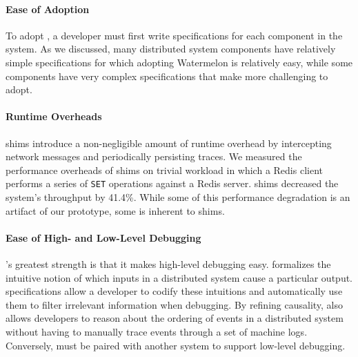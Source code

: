 \paragraph{Ease of Adoption}
To adopt \fluent{}, a developer must first write \watprovenance{}
specifications for each component in the system. As we discussed, many
distributed system components have relatively simple \watprovenance{}
specifications for which adopting Watermelon is relatively easy, while some
components have very complex \watprovenance{} specifications that make
\fluent{} more challenging to adopt.

\paragraph{Runtime Overheads}
\fluent{} shims introduce a non-negligible amount of runtime overhead by
intercepting network messages and periodically persisting traces. We measured
the performance overheads of \fluent{} shims on trivial workload in which a
Redis client performs a series of \texttt{SET} operations against a Redis
server. \fluent{} shims decreased the system's throughput by 41.4\%. While some
of this performance degradation is an artifact of our prototype, some is
inherent to shims.

\paragraph{Ease of High- and Low-Level Debugging}
\fluent{}'s greatest strength is that it makes high-level debugging easy.
\Watprovenance{} formalizes the intuitive notion of which inputs in a
distributed system cause a particular output. \Watprovenance{} specifications
allow a developer to codify these intuitions and automatically use them to
filter irrelevant information when debugging. By refining causality,
\watprovenance{} also allows developers to reason about the ordering of events
in a distributed system without having to manually trace events through a set
of machine logs. Conversely, \fluent{} must be paired with another system to
support low-level debugging.
